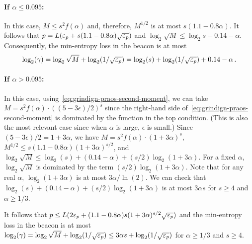 \paragraph{If $\alpha \leq 0.095$:} 
In this case, $M \leq s^2 f(\alpha)$ 
and, therefore, $M^{1/2}$ is at most $s (1.1 - 0.8 \alpha)$.
It follows that $p = L (\mathsf{\varepsilon}_p + s (1.1 - 0.8 \alpha) \sqrt{\mathsf{\varepsilon}_p})$
and 
$
\log_2 \sqrt{M}
\leq \log_2 s + 0.14 - \alpha
$.
Consequently, the min-entropy loss in the beacon is at most 
$$
  \log_2(\gamma) 
  = \log_2 \sqrt{M} + \log_2(1/\sqrt{\mathsf{\varepsilon}_p}) 
  = \log_2(s) + \log_2(1/\sqrt{\mathsf{\varepsilon}_p})  
    + 0.14 - \alpha
    \,.
$$




\paragraph{If $\alpha > 0.095$:} 
In this case, using~\eqref{eq:grindign-praos-second-moment}, 
we can take 
$M = s^2 f(\alpha) \cdot ((5 - 3\epsilon)/2)^s$ 
since 
the right-hand side of~\eqref{eq:grindign-praos-second-moment} is dominated by the function in the top condition. 
(This is also the most relevant case since 
when $\alpha$ is large, $\epsilon$ is small.)
Since 
$(5-3\epsilon)/2 = 1 + 3\alpha$, 
we have 
$M = s^2 f(\alpha) \cdot (1+3\alpha)^s$, 
$M^{1/2} \leq s (1.1 - 0.8 \alpha) (1+3\alpha)^{s/2}$, 
and $\log_2 \sqrt{M} \leq \log_2(s) + (0.14 - \alpha) + (s/2) \log_2(1+3\alpha)$. 
For a fixed $\alpha$, 
$\log_2 \sqrt{M}$ is dominated by the term $(s/2) \log_2(1+3\alpha)$. 
Note that for any real $\alpha$, $\log_2(1+3 \alpha)$ is at most $3\alpha/\ln(2)$.
We can check that $\log_2(s) + (0.14 - \alpha) + (s/2) \log_2(1+3\alpha)$ is at most $3 \alpha s$ for $s \geq 4$ and $\alpha \geq 1/3$.

It follows that 
$p \leq L (2 \mathsf{\varepsilon}_p + (1.1 - 0.8 \alpha) s (1+3\alpha)^{s/2} \sqrt{\mathsf{\varepsilon}_p} )$ 
and 
the min-entropy loss in the beacon is at most 
$
  \log_2(\gamma) 
  = \log_2 \sqrt{M} + \log_2(1/\sqrt{\mathsf{\varepsilon}_p})
  \leq 3 \alpha s + \log_2(1/\sqrt{\mathsf{\varepsilon}_p}) 
$ 
for $\alpha \geq 1/3$ and $s \geq 4$. 







